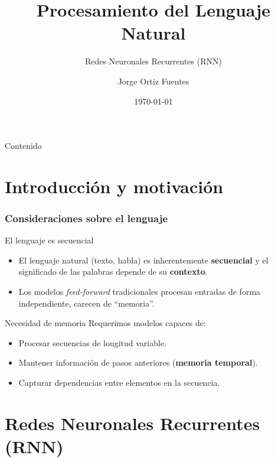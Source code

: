 \documentclass[handout]{beamer}
\title{Procesamiento del Lenguaje Natural}
\subtitle{Redes Neuronales Recurrentes (RNN)}
\author[Jorge Ortiz Fuentes]{Jorge Ortiz Fuentes}
\date{\today}
\begin{document}
\begin{frame}[plain]
  \titlepage
\end{frame}

\begin{frame}{Contenido}
  \tableofcontents
\end{frame}

\section{Introducción y motivación}

\begin{frame}
    \frametitle{Consideraciones sobre el lenguaje}
    \begin{block}{El lenguaje es secuencial}
        \begin{itemize}
            \item El lenguaje natural (texto, habla) es inherentemente \textbf{secuencial} y el significado de las palabras depende de su \textbf{contexto}.
            \item Los modelos \textit{feed-forward} tradicionales procesan entradas de forma independiente, carecen de ``memoria''. %
        \end{itemize}
    \end{block}
    \begin{alertblock}{Necesidad de memoria}
        Requerimos modelos capaces de:
        \begin{itemize}
            \item Procesar secuencias de longitud variable.
            \item Mantener información de pasos anteriores (\textbf{memoria temporal}).
            \item Capturar dependencias entre elementos en la secuencia.
        \end{itemize}
    \end{alertblock}
\end{frame}

\section{Redes Neuronales Recurrentes (RNN)}
\end{document}
